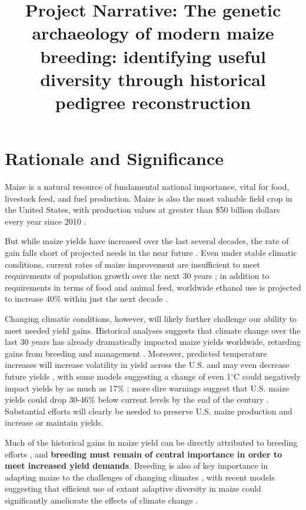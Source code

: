 \documentclass[12pt]{article}
\begin{document}
\title{Project Narrative: The genetic archaeology of modern maize breeding: identifying useful diversity through historical pedigree reconstruction}
\author{}
\date{}
\maketitle

\section*{Rationale and Significance}
\label{sec:rationale}

Maize is a natural resource of fundamental national importance, vital for food, livestock feed, and fuel production.
Maize is also the most valuable field crop in the United States, with production values at greater than \$50 billion dollars every year since 2010 \citep{usdanass}. 

But while maize yields have increased over the last several decades, the rate of gain falls short of projected needs in the near future \citep{grassini2013distinguishing}.
Even under stable climatic conditions, current rates of maize improvement are insufficient to meet requirements of population growth over the next 30 years \citep{ray2013yield}; in  addition to requirements in terms of food and animal feed, worldwide ethanol use is projected to increase 40\% within just the next decade \citep{usdalong}.

Changing climatic conditions, however, will likely further challenge our ability to meet needed yield gains. 
Historical analyses suggests that climate change over the last 30 years has already dramatically impacted maize yields worldwide, retarding gains from breeding and management \citep{Lobell2011}.
Moreover, predicted temperature increases will increase volatility in yield across the U.S. and may even decrease future yields \citep{urban2012projected}, with some models suggesting a change of even 1$^{\circ}$C could negatively impact yields by as much as 17\% \citep{lobell2003climate}; more dire warnings suggest that U.S. maize yields could drop 30-46\% below current levels by the end of the century \citep{schlenker2009nonlinear}.
Substantial efforts will clearly be needed to preserve U.S. maize production and increase or maintain yields.  

Much of the historical gains in maize yield can be directly attributed to breeding efforts \citep{Duvick1992, duvick2005genetic}, and {\bf breeding must remain of central importance in order to meet increased yield demands}.  
Breeding is also of key importance in adapting maize to the challenges of changing climates \citep{Troyer2004a}, with recent models suggesting that efficient use of extant adaptive diversity in maize could significantly ameliorate the effects of climate change \citep{butler2013adaptation}.   
\end{document}
